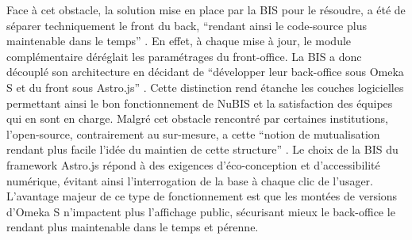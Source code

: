 Face à cet obstacle, la solution mise en place par la \ac{BIS} pour le résoudre, a été de séparer techniquement le front du back, \enquote{rendant ainsi le code-source plus maintenable dans le temps} . En effet, à chaque mise à jour, le module complémentaire déréglait les paramétrages du front-office. La \ac{BIS} a donc découplé son architecture en décidant de \enquote{développer leur back-office sous Omeka S et du front sous Astro.js} . Cette distinction rend étanche les couches logicielles permettant ainsi le bon fonctionnement de NuBIS et la satisfaction des équipes qui en sont en charge. Malgré cet obstacle rencontré par certaines institutions, l'open-source, contrairement au sur-mesure, a cette \enquote{notion de mutualisation rendant plus facile l'idée du maintien de cette structure} . Le choix de la \ac{BIS} du framework Astro.js répond à des exigences d'éco-conception et d'accessibilité numérique, évitant ainsi l'interrogation de la base à chaque clic de l'usager. L'avantage majeur de ce type de fonctionnement est que les montées de versions d'Omeka S n'impactent plus l'affichage public, sécurisant mieux le back-office le rendant plus maintenable dans le temps et pérenne.